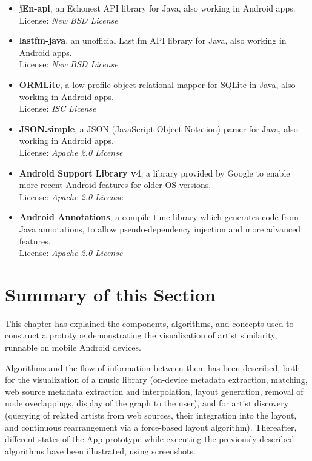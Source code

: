 \begin{itemize}
	
	\item \textbf{jEn-api}, an Echonest API library for Java, also working in Android apps. \\
License: \emph{New BSD License}

	\item \textbf{lastfm-java}, an unofficial Last.fm API library for Java, also working in Android apps. \\
License: \emph{New BSD License}

	\item \textbf{ORMLite}, a low-profile object relational mapper for SQLite in Java, also working in Android apps. \\
License: \emph{ISC License}

	\item \textbf{JSON.simple}, a JSON (JavaScript Object Notation) parser for Java, also working in Android apps. \\
License: \emph{Apache 2.0 License}

	\item \textbf{Android Support Library v4}, a library provided by Google to enable more recent Android features for older OS versions. \\
License: \emph{Apache 2.0 License}

	\item \textbf{Android Annotations}, a compile-time library which generates code from Java annotations, to allow pseudo-dependency injection and more advanced features. \\
License: \emph{Apache 2.0 License}

\end{itemize}

\section{Summary of this Section}

This chapter has explained the components, algorithms, and concepts used to construct a prototype demonstrating the visualization of artist similarity, runnable on mobile Android devices.

Algorithms and the flow of information between them has been described, both for the visualization of a music library (on-device metadata extraction, matching, web source metadata extraction and interpolation, layout generation, removal of node overlappings, display of the graph to the user), and for artist discovery (querying of related artists from web sources, their integration into the layout, and continuous rearrangement via a force-based layout algorithm).
Thereafter, different states of the App prototype while executing the previously described algorithms have been illustrated, using screenshots.

